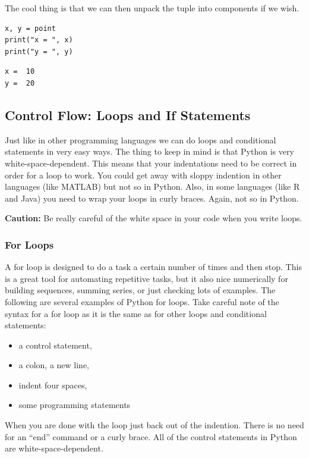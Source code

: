 \begin{example}
 The cool thing is that we can then unpack the tuple into components if we wish.   
 \bcode
\begin{lstlisting}
x, y = point
print("x = ", x)
print("y = ", y)
\end{lstlisting}
\boutput
\begin{lstlisting}
x =  10
y =  20
\end{lstlisting}
\end{example}



\subsection{Control Flow: Loops and If Statements}
Just like in other programming languages we can do loops and conditional statements in
very easy ways. The thing to keep in mind is that Python is very white-space-dependent.
This means that your indentations need to be correct in order for a loop to work. You
could get away with sloppy indention in other languages (like MATLAB) but not so in
Python. Also, in some languages (like R and Java) you need to wrap your loops in curly
braces. Again, not so in Python.

{\bf Caution:} Be really careful of the white space in your code when you write loops.

\subsubsection{For Loops}
A for loop is designed to do a task a certain number of times and then stop. This is a
great tool for automating repetitive tasks, but it also nice numerically for building
sequences, summing series, or just checking lots of examples. The following are several
examples of Python for loops. Take careful note of the syntax for a for loop as it is the
same as for other loops and conditional statements:

\begin{itemize}
    \item a control statement,
    \item a colon, a new line,
    \item indent four spaces,
    \item some programming statements
\end{itemize}
When you are done with the loop just back out of the indention. There is no need for an
``end'' command or a curly brace. All of the control statements in Python are
white-space-dependent.

